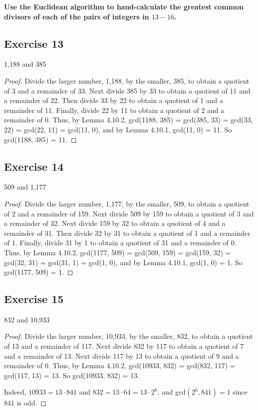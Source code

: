 \documentclass[14pt]{extarticle}
\newcommand{\cy}{\color{cyan}}
\begin{document}
{\bf \cy Use the Euclidean algorithm to hand-calculate the greatest common divisors of each of the pairs of integers in $13-16$.}

\subsection{Exercise 13}
1,188 and 385

\begin{proof}
    Divide the larger number, 1,188, by the smaller, 385, to obtain a quotient of 3 and a remainder of 33. Next divide 385 by 33 to obtain a quotient of 11 and a remainder of 22. Then divide 33 by 22 to obtain a quotient of 1 and a remainder of 11. Finally, divide 22 by 11 to obtain a quotient of 2 and a remainder of 0. Thus, by Lemma 4.10.2, gcd(1188, 385) = gcd(385, 33) = gcd(33, 22) = gcd(22, 11) = gcd(11, 0), and by Lemma 4.10.1, gcd(11, 0) = 11. So gcd(1188, 385) = 11.
\end{proof}

\subsection{Exercise 14}
509 and 1,177

\begin{proof}
    Divide the larger number, 1,177, by the smaller, 509, to obtain a quotient of 2 and a remainder of 159. Next divide 509 by 159 to obtain a quotient of 3 and a remainder of 32. Next divide 159 by 32 to obtain a quotient of 4 and a remainder of 31. Then divide 32 by 31 to obtain a quotient of 1 and a remainder of 1. Finally, divide 31 by 1 to obtain a quotient of 31 and a remainder of 0. Thus, by Lemma 4.10.2, gcd(1177, 509) = gcd(509, 159) = gcd(159, 32) = gcd(32, 31) = gcd(31, 1) = gcd(1, 0), and by Lemma 4.10.1, gcd(1, 0) = 1. So gcd(1177, 509) = 1.
\end{proof}

\subsection{Exercise 15}
832 and 10,933

\begin{proof}
    Divide the larger number, 10,933, by the smaller, 832, to obtain a quotient of 13 and a remainder of 117. Next divide 832 by 117 to obtain a quotient of 7 and a remainder of 13. Next divide 117 by 13 to obtain a quotient of 9 and a remainder of 0. Thus, by Lemma 4.10.2, gcd(10933, 832) = gcd(832, 117) = gcd(117, 13) = 13. So gcd(10933, 832) = 13.

    Indeed, $10933 = 13 \cdot 841$ and $832 = 13 \cdot 64 = 13 \cdot 2^6$, and gcd$(2^6, 841) = 1$ since 841 is odd.
\end{proof}
\end{document}
